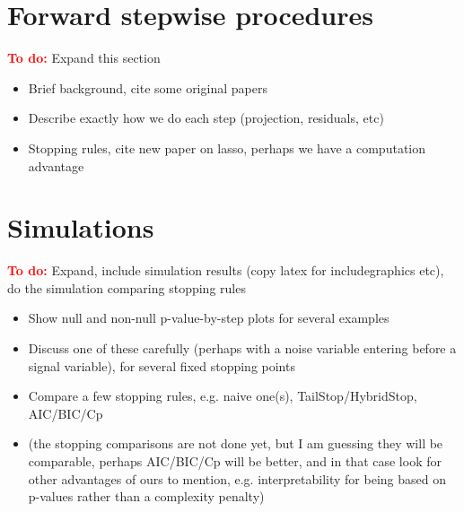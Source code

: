 \documentclass{imsart}
\newcommand{\todo}{\textcolor{red}{\textbf{To do: }}}
\begin{document}
\section{Forward stepwise procedures}

\todo Expand this section

\begin{itemize}
  \item Brief background, cite some original papers
  \item Describe exactly how we do each step (projection, residuals, etc) 
  \item Stopping rules, cite new paper on lasso, perhaps we have
    a computation advantage
\end{itemize}

\section{Simulations}

\todo Expand, include simulation results (copy latex for
includegraphics etc), do the simulation comparing stopping rules

\begin{itemize}
  \item Show null and non-null p-value-by-step plots for several examples
  \item Discuss one of these carefully (perhaps with a noise variable
    entering before a signal variable), for several fixed stopping points
  \item Compare a few stopping rules, e.g. naive one(s),
    TailStop/HybridStop, AIC/BIC/Cp
  \item (the stopping comparisons are not done yet, but I am guessing
    they will be comparable, perhaps AIC/BIC/Cp will be better, and in
    that case look for other advantages of ours to mention,
    e.g. interpretability for being based on p-values rather than a
    complexity penalty)

\end{itemize}
\end{document}
